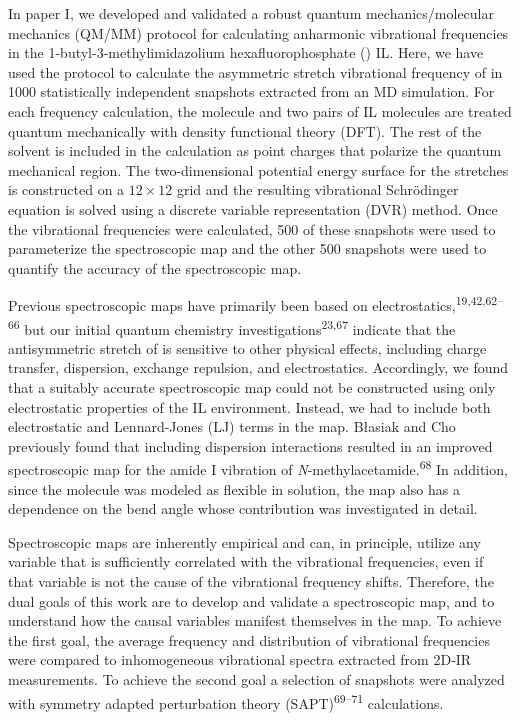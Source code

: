 In paper I, we developed and validated a robust quantum mechanics/molecular mechanics (QM/MM) protocol for calculating anharmonic  vibrational frequencies in the 1-butyl-3-methylimidazolium hexafluorophosphate (\ce{[C4C1im][PF6]}) IL. Here, we have used the protocol to calculate the asymmetric stretch vibrational frequency of  in 1000 statistically independent snapshots extracted from an MD simulation. For each frequency calculation, the  molecule and two pairs of IL molecules are treated quantum mechanically with density functional theory (DFT). The rest of the solvent is included in the calculation as point charges that polarize the quantum mechanical region. The two-dimensional potential energy surface for the  stretches is constructed on a \(12 \times 12\) grid and the resulting vibrational Schrödinger equation is solved using a discrete variable representation (DVR) method. Once the vibrational frequencies were calculated, \num{500} of these snapshots were used to parameterize the spectroscopic map and the other \num{500} snapshots were used to quantify the accuracy of the spectroscopic map.

Previous spectroscopic maps have primarily been based on electrostatics,\textsuperscript{19,42,62--66} but our initial quantum chemistry investigations\textsuperscript{23,67} indicate that the antisymmetric stretch of  is sensitive to other physical effects, including charge transfer, dispersion, exchange repulsion, and electrostatics. Accordingly, we found that a suitably accurate spectroscopic map could not be constructed using only electrostatic properties of the IL environment. Instead, we had to include both electrostatic and Lennard-Jones (LJ) terms in the map. Błasiak and Cho previously found that including dispersion interactions resulted in an improved spectroscopic map for the amide I vibration of \textit{N}-methylacetamide.\textsuperscript{68} In addition, since the  molecule was modeled as flexible in solution, the map also has a dependence on the  bend angle whose contribution was investigated in detail.

Spectroscopic maps are inherently empirical and can, in principle, utilize any variable that is sufficiently correlated with the vibrational frequencies, even if that variable is not the cause of the vibrational frequency shifts. Therefore, the dual goals of this work are to develop and validate a spectroscopic map, and to understand how the causal variables manifest themselves in the map. To achieve the first goal, the average frequency and distribution of vibrational frequencies were compared to inhomogeneous vibrational spectra extracted from 2D-IR measurements. To achieve the second goal a selection of snapshots were analyzed with symmetry adapted perturbation theory (SAPT)\textsuperscript{69--71} calculations.

